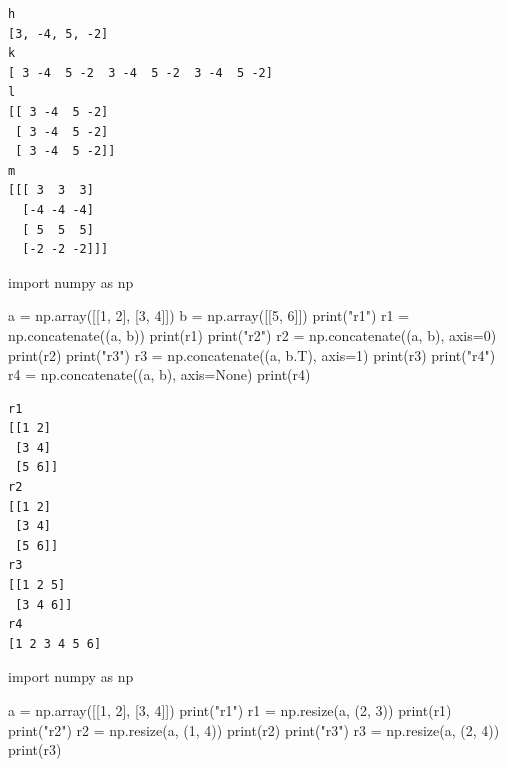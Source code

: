 \documentclass[
  polish,
  letterpaper,
  DIV=11,
  numbers=noendperiod]{scrreprt}
\newenvironment{Shaded}{\begin{snugshade}}{\end{snugshade}}
\newcommand{\BuiltInTok}[1]{\textcolor[rgb]{0.00,0.23,0.31}{#1}}
\newcommand{\DecValTok}[1]{\textcolor[rgb]{0.68,0.00,0.00}{#1}}
\newcommand{\ImportTok}[1]{\textcolor[rgb]{0.00,0.46,0.62}{#1}}
\newcommand{\NormalTok}[1]{\textcolor[rgb]{0.00,0.23,0.31}{#1}}
\newcommand{\OperatorTok}[1]{\textcolor[rgb]{0.37,0.37,0.37}{#1}}
\newcommand{\StringTok}[1]{\textcolor[rgb]{0.13,0.47,0.30}{#1}}
\newcommand{\VariableTok}[1]{\textcolor[rgb]{0.07,0.07,0.07}{#1}}
\begin{document}
\begin{verbatim}
h
[3, -4, 5, -2]
k
[ 3 -4  5 -2  3 -4  5 -2  3 -4  5 -2]
l
[[ 3 -4  5 -2]
 [ 3 -4  5 -2]
 [ 3 -4  5 -2]]
m
[[[ 3  3  3]
  [-4 -4 -4]
  [ 5  5  5]
  [-2 -2 -2]]]
\end{verbatim}

\begin{Shaded}
\begin{Highlighting}[]
\ImportTok{import}\NormalTok{ numpy }\ImportTok{as}\NormalTok{ np}

\NormalTok{a }\OperatorTok{=}\NormalTok{ np.array([[}\DecValTok{1}\NormalTok{, }\DecValTok{2}\NormalTok{], [}\DecValTok{3}\NormalTok{, }\DecValTok{4}\NormalTok{]])}
\NormalTok{b }\OperatorTok{=}\NormalTok{ np.array([[}\DecValTok{5}\NormalTok{, }\DecValTok{6}\NormalTok{]])}
\BuiltInTok{print}\NormalTok{(}\StringTok{"r1"}\NormalTok{)}
\NormalTok{r1 }\OperatorTok{=}\NormalTok{ np.concatenate((a, b))}
\BuiltInTok{print}\NormalTok{(r1)}
\BuiltInTok{print}\NormalTok{(}\StringTok{"r2"}\NormalTok{)}
\NormalTok{r2 }\OperatorTok{=}\NormalTok{ np.concatenate((a, b), axis}\OperatorTok{=}\DecValTok{0}\NormalTok{)}
\BuiltInTok{print}\NormalTok{(r2)}
\BuiltInTok{print}\NormalTok{(}\StringTok{"r3"}\NormalTok{)}
\NormalTok{r3 }\OperatorTok{=}\NormalTok{ np.concatenate((a, b.T), axis}\OperatorTok{=}\DecValTok{1}\NormalTok{)}
\BuiltInTok{print}\NormalTok{(r3)}
\BuiltInTok{print}\NormalTok{(}\StringTok{"r4"}\NormalTok{)}
\NormalTok{r4 }\OperatorTok{=}\NormalTok{ np.concatenate((a, b), axis}\OperatorTok{=}\VariableTok{None}\NormalTok{)}
\BuiltInTok{print}\NormalTok{(r4)}
\end{Highlighting}
\end{Shaded}

\begin{verbatim}
r1
[[1 2]
 [3 4]
 [5 6]]
r2
[[1 2]
 [3 4]
 [5 6]]
r3
[[1 2 5]
 [3 4 6]]
r4
[1 2 3 4 5 6]
\end{verbatim}

\begin{Shaded}
\begin{Highlighting}[]
\ImportTok{import}\NormalTok{ numpy }\ImportTok{as}\NormalTok{ np}

\NormalTok{a }\OperatorTok{=}\NormalTok{ np.array([[}\DecValTok{1}\NormalTok{, }\DecValTok{2}\NormalTok{], [}\DecValTok{3}\NormalTok{, }\DecValTok{4}\NormalTok{]])}
\BuiltInTok{print}\NormalTok{(}\StringTok{"r1"}\NormalTok{)}
\NormalTok{r1 }\OperatorTok{=}\NormalTok{ np.resize(a, (}\DecValTok{2}\NormalTok{, }\DecValTok{3}\NormalTok{))}
\BuiltInTok{print}\NormalTok{(r1)}
\BuiltInTok{print}\NormalTok{(}\StringTok{"r2"}\NormalTok{)}
\NormalTok{r2 }\OperatorTok{=}\NormalTok{ np.resize(a, (}\DecValTok{1}\NormalTok{, }\DecValTok{4}\NormalTok{))}
\BuiltInTok{print}\NormalTok{(r2)}
\BuiltInTok{print}\NormalTok{(}\StringTok{"r3"}\NormalTok{)}
\NormalTok{r3 }\OperatorTok{=}\NormalTok{ np.resize(a, (}\DecValTok{2}\NormalTok{, }\DecValTok{4}\NormalTok{))}
\BuiltInTok{print}\NormalTok{(r3)}
\end{Highlighting}
\end{Shaded}
\end{document}
